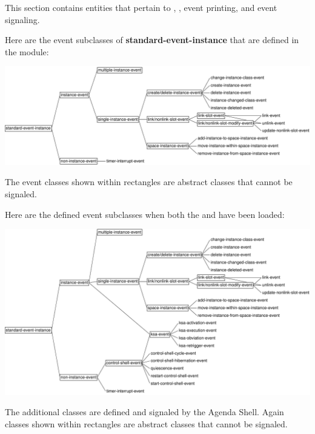\documentclass[10pt,twoside,english,pdftex]{article}
\begin{document}
This section contains  entities that pertain to
, , event printing, and event signaling.

%
Here are the event subclasses of \textbf{standard-event-instance}
that are defined in the  
module:

\T\begin{ifhtml}
\T\end{ifhtml}
\W\begin{iftex} 
\begin{center}
\includegraphics[scale=0.85]{gbbopen-events}
\end{center}
\W\end{iftex}

\noindent The event classes shown within rectangles are abstract classes
that cannot be signaled.

\W{}

Here are the defined event subclasses when both the  and
  have been loaded:
%
\T\begin{ifhtml}
\T\end{ifhtml}
\W\begin{iftex} 
\begin{center}
\includegraphics[scale=0.85]{agenda-shell-events}
\end{center}
\W\end{iftex}
%
The additional  classes are defined and signaled by
the Agenda Shell.  Again classes shown within rectangles are abstract classes
that cannot be signaled.
\end{document}
